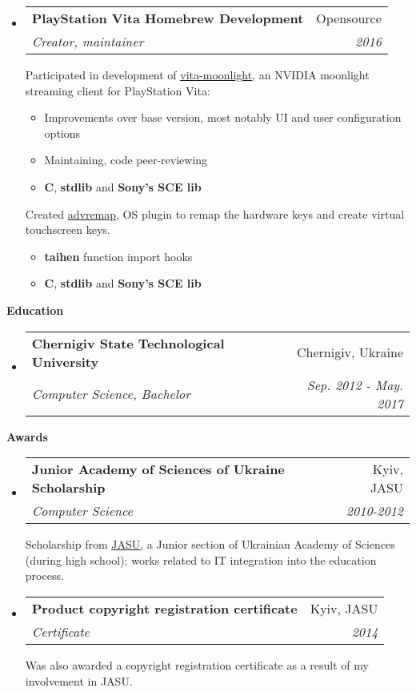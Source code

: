 \documentclass[letterpaper,11pt]{article}
\makeatletter
\newcommand{\resitem}[1]{\item #1 \vspace{-2pt}}
\newcommand{\resheading}[1]{{\large \colorbox{mygrey}{\begin{minipage}{\textwidth}{\textbf{#1 \vphantom{p\^{E}}}}\end{minipage}}}}
\newcommand{\ressubheading}[4]{
\begin{tabular*}{7.1in}{l@{\extracolsep{\fill}}r}
		\textbf{#1} & #2 \\
		\textit{#3} & \textit{#4} \\
\end{tabular*}\vspace{-6pt}}
\makeatother
\begin{document}
\begin{itemize}
	\item
		\ressubheading{PlayStation Vita Homebrew Development}{Opensource}{Creator, maintainer}{2016}


		Participated in development of \href{https://github.com/xyzz/vita-moonlight}{\textcolor{linkblue}{\underline{vita-moonlight}}}, an NVIDIA moonlight streaming client for PlayStation Vita:
		\begin{itemize}
				\resitem{Improvements over base version, most notably UI and user configuration options}
				\resitem{Maintaining, code peer-reviewing}
				\resitem{\textbf{C}, \textbf{stdlib} and \textbf{Sony's SCE lib}}
		\end{itemize}

		Created \href{https://github.com/shdwp/advremap}{\textcolor{linkblue}{\underline{advremap}}}, OS plugin to remap the hardware keys and create virtual touchscreen keys.
		\begin{itemize}
				\resitem{\textbf{taihen} function import hooks}
				\resitem{\textbf{C}, \textbf{stdlib} and \textbf{Sony's SCE lib}}
		\end{itemize}
\end{itemize}

\resheading{Education}
\begin{itemize}
\item
	\ressubheading{Chernigiv State Technological University}{Chernigiv, Ukraine}{Computer Science, Bachelor}{Sep. 2012 - May. 2017}
\end{itemize}

\resheading{Awards}
\begin{itemize}
	\item
		\ressubheading{Junior Academy of Sciences of Ukraine Scholarship}{Kyiv, JASU}{Computer Science}{2010-2012}

		Scholarship from \href{http://man.gov.ua/en}{\textcolor{linkblue}{\underline{JASU}}}, a Junior section of Ukrainian Academy of Sciences (during high school); works related to IT integration into the education process.
	\item
		\ressubheading{Product copyright registration certificate}{Kyiv, JASU}{Certificate \textnumero40491}{2014}

		Was also awarded a copyright registration certificate as a result of my involvement in JASU.
\end{itemize}
\end{document}
